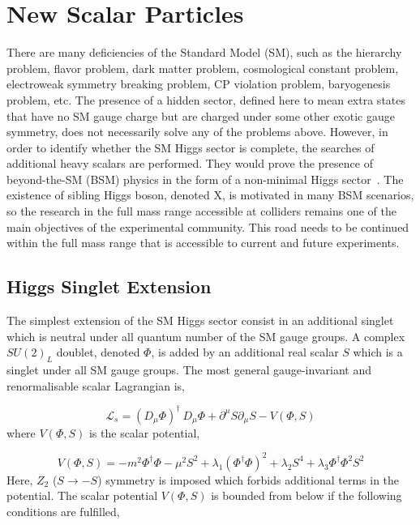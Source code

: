 \section{New Scalar Particles}
There are many deficiencies of the Standard Model (SM), such as the hierarchy problem,
flavor problem, dark matter problem, cosmological constant problem, electroweak symmetry breaking problem, CP violation problem, baryogenesis problem, etc.
The presence of a hidden sector, defined here to mean extra states that
have no SM gauge charge but are charged under some other exotic gauge symmetry, does not necessarily solve any of the problems above. However, in order to identify whether the SM Higgs sector is complete,  the searches of additional heavy scalars are performed.  They would prove the presence of beyond-the-SM (BSM) physics in the form of a non-minimal Higgs sector~\cite{Robens:2015gla}. The existence of sibling Higgs boson, denoted X, is motivated in many BSM scenarios, so the research in the full mass range accessible at colliders  remains one of the main objectives of the experimental community. This  road  needs  to  be continued within the full mass range that is accessible to current and future experiments.
\newline
\subsection*{Higgs Singlet Extension}
The simplest extension of the SM Higgs sector consist in an additional singlet which is neutral under all quantum number of the SM gauge groups.
A complex $SU(2)_L$ doublet,  denoted $\Phi$, is added by an additional real scalar $S$ which is a singlet under all SM gauge groups. 
The most general gauge-invariant and renormalisable scalar Lagrangian is,


\begin{equation}
 \mathcal{L}_s = (D_{\mu} \Phi )^{\dagger}  \: D_{\mu} \Phi  +  \partial^{\mu}S   \partial_{\mu}S -V(\Phi, S)     \end{equation}
where $V(\Phi, S) $ is the scalar potential,  

\begin{equation}
 V(\Phi, S)= -m^2   \Phi ^{\dagger}\Phi -\mu^2 S^2 +\lambda_1 (\Phi ^{\dagger}\Phi)^2 +\lambda_2 S^4 + \lambda_3 \Phi ^{\dagger}\Phi^2 S^2  \end{equation}
Here, $Z_2$ ($S \rightarrow -S$) symmetry is imposed which forbids additional terms in the potential.
The scalar potential $V(\Phi, S)$ is bounded from below if the following conditions are fulfilled,

